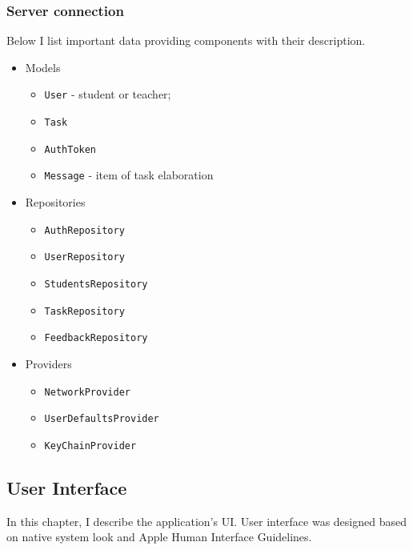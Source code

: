 \documentclass[
  biblatex,
  language=english,
  figures=false,
  sourcecodes,
  glossaries,
  index
]{kidiplom}
\begin{document}
\subsubsection{Server connection}
Below I list important data providing components with their description.
\begin{itemize}
	\item Models
	\begin{itemize}
		\item \texttt{User} - student or teacher;
		\item \texttt{Task}
		\item \texttt{AuthToken}
		\item \texttt{Message} - item of task elaboration
	\end{itemize}
	\item Repositories
	\begin{itemize}
		\item \texttt{AuthRepository}
		\item \texttt{UserRepository}
		\item \texttt{StudentsRepository}
		\item \texttt{TaskRepository}
		\item \texttt{FeedbackRepository}
	\end{itemize}
	\item Providers
	\begin{itemize}
		\item \texttt{NetworkProvider}
		\item \texttt{UserDefaultsProvider}
		\item \texttt{KeyChainProvider}
	\end{itemize}
\end{itemize}

\subsection{User Interface}
In this chapter, I describe the application's UI. User interface was designed based on native system look and Apple Human Interface Guidelines.
\end{document}
